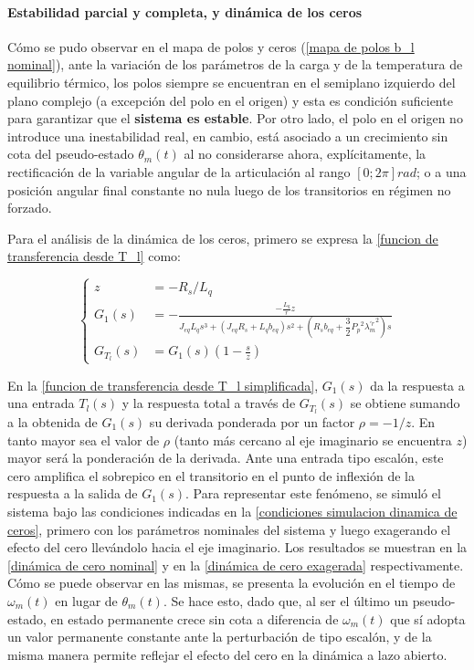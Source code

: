 \documentclass[a4paper, 10pt, onecolumn,journal]{ieeeconf}
\begin{document}
\paragraph{\textbf{Estabilidad parcial y completa, y dinámica de los ceros}}
Cómo se pudo observar en el mapa de polos y ceros (\cref{mapa de polos b_l nominal}),  ante la variación de los parámetros de la carga
y de la temperatura de equilibrio térmico, los polos siempre se encuentran
en el semiplano izquierdo del plano complejo (a excepción del polo en el origen) y esta es condición suficiente para
garantizar que el \textbf{sistema es estable}. Por otro lado, el polo en el origen no introduce una inestabilidad real, 
en cambio, está asociado a un crecimiento sin cota del pseudo-estado $\theta_m(t)$ al no considerarse ahora, explícitamente,
la rectificación de la variable angular de la articulación al rango  $[0;2\pi] rad$; o a una posición angular final constante no nula
luego de los transitorios en régimen no forzado.

Para el análisis de la dinámica de los ceros, primero %
se expresa la \cref{funcion de transferencia desde T_l}
como:

\begin{equation}
    \begin{cases}
        z &= -R_s/L_q\\
        G_1(s) &= -\frac{-\frac{L_q}{r}z}{J_{eq} L_{q} s^3 +\left( J_{eq} R_{s} + L_{q} b_{eq} \right)s^2 + \left( R_{s} b_{eq} + \dfrac{3}{2} {P_{p}}^2 { \lambda^{'r}_m}^2\right) s}\\
	    G_{T_l}(s) &= G_1(s)\left( 1 - \frac{s}{z}\right)
    \end{cases}
	\label{funcion de transferencia desde T_l simplificada}
\end{equation}

En la \cref{funcion de transferencia desde T_l simplificada}, $G_1(s)$ da la respuesta a una entrada $T_l(s)$
y la respuesta total a través de $G_{T_l}(s)$ se obtiene sumando a la obtenida de $G_1(s)$ su derivada
ponderada por un factor $\rho = -1/z$. En tanto mayor sea el valor de $\rho$ (tanto más cercano al eje imaginario se encuentra $z$)
mayor será la ponderación de la derivada. Ante una entrada tipo escalón,
este cero amplifica el sobrepico en el transitorio en el punto de inflexión de la respuesta a la salida de 
$G_1(s)$. Para representar este fenómeno, se simuló el sistema bajo las condiciones indicadas en la \cref{condiciones simulacion dinamica de ceros},
primero con los parámetros nominales del sistema y luego exagerando
el efecto del cero llevándolo hacia el eje imaginario. Los resultados se muestran en la \cref{dinámica de cero nominal} y en la \cref{dinámica de cero exagerada} respectivamente.
Cómo se puede observar en las mismas, se presenta la evolución en el tiempo de $\omega_m(t)$ en lugar de $\theta_m(t)$.
Se hace esto, dado que, al ser el último un pseudo-estado, en estado permanente crece sin cota a diferencia de $\omega_m(t)$ que sí adopta un valor permanente constante ante la perturbación de tipo escalón, y de la misma
manera permite reflejar el efecto del cero en la dinámica a lazo abierto.
\end{document}
